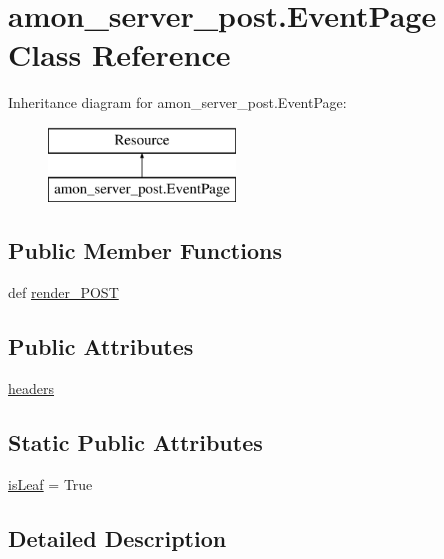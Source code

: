 \hypertarget{classamon__server__post_1_1_event_page}{\section{amon\-\_\-server\-\_\-post.\-Event\-Page Class Reference}
\label{classamon__server__post_1_1_event_page}
}
Inheritance diagram for amon\-\_\-server\-\_\-post.\-Event\-Page\-:\begin{figure}[H]
\begin{center}
\leavevmode
\includegraphics[height=2.000000cm]{dd/df8/classamon__server__post_1_1_event_page}
\end{center}
\end{figure}
\subsection*{Public Member Functions}
\begin{DoxyCompactItemize}
\item 
def \hyperlink{classamon__server__post_1_1_event_page_a47396ff6c7b3e54804a319a65fae04ef}{render\-\_\-\-P\-O\-S\-T}
\end{DoxyCompactItemize}
\subsection*{Public Attributes}
\begin{DoxyCompactItemize}
\item 
\hyperlink{classamon__server__post_1_1_event_page_aebe3efcc148ea3e5d0648b0bcd354652}{headers}
\end{DoxyCompactItemize}
\subsection*{Static Public Attributes}
\begin{DoxyCompactItemize}
\item 
\hyperlink{classamon__server__post_1_1_event_page_a79612515feec2007f430422f8b4dbbe4}{is\-Leaf} = True
\end{DoxyCompactItemize}


\subsection{Detailed Description}


